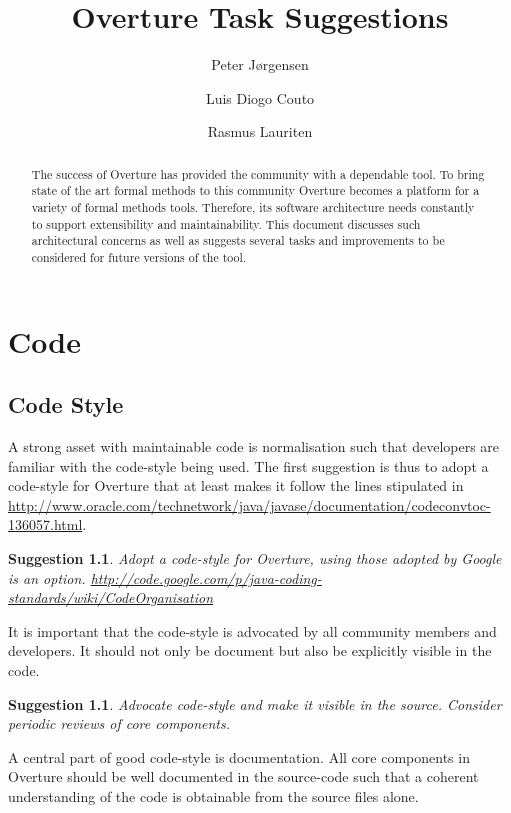 \documentclass[11pt]{overturerep} \usepackage{t1enc,times,a4,t1enc}
\title{Overture Task Suggestions}
\author{ Peter J\o rgensen \and Luis Diogo Couto \and Rasmus Lauriten }
\newtheorem{sug}[subsection]{Suggestion}
\begin{document}
\maketitle


\begin{abstract} The success of Overture has provided the community with a
    dependable tool. To bring state of the art formal methods to this community
    Overture becomes a platform for a variety of formal methods tools.
    Therefore, its software architecture needs constantly to support
extensibility and maintainability. 
    This document discusses such architectural concerns as well as suggests
    several tasks and improvements to be considered for future versions of the
    tool.
\end{abstract}


\chapter{Code}

\section{Code Style} A strong asset with maintainable code is normalisation
such that developers are familiar with the code-style being used. The first
suggestion is thus to adopt a code-style for Overture that at least makes it
follow the lines stipulated in
\url{http://www.oracle.com/technetwork/java/javase/documentation/codeconvtoc-136057.html}.

\begin{sug} Adopt a code-style for Overture, using those adopted by Google is
an option.
\url{http://code.google.com/p/java-coding-standards/wiki/CodeOrganisation}
\end{sug}

It is important that the code-style is advocated by all community members and
developers. It should not only be document but also be explicitly visible in
the code.

\begin{sug} Advocate code-style and make it visible in the source. Consider
periodic reviews of core components.  \end{sug}

A central part of good code-style is documentation. All core components in
Overture should be well documented in the source-code such that a coherent
understanding of the code is obtainable from the source files alone.
\end{document}
